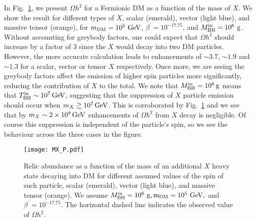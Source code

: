 \documentclass[aps,prd,reprint,twocolumn,preprintnumbers,floatfix,nofootinbib]{revtex4-1}
\newcommand{\MBH}{M_{\rm BH}}
\newcommand{\TBHi}{T_{\rm BH}^{\rm in}}
\newcommand{\MBHi}{M_{\rm BH}^{\rm in}}
\newcommand{\GeV}{\rm GeV}
\newcommand{\g}{\rm g}
\newcommand{\Oh}{\Omega h^2}
\begin{document}
In Fig.~\ref{fig:Xfig}, we present $\Omega h^2$ for a Fermionic DM as a function of the mass of $X$. We show the result for different types of $X$, scalar (emerald), vector (light blue), and massive tensor (orange), for $m_{\rm DM} = 10^5~\GeV$, $\beta^\prime = 10^{-17.75}$, and $\MBH^{\rm in} = 10^6~\g$. Without accounting for greybody factors, one could expect that $\Oh$ should increase by a factor of 3 since the $X$ would decay into two DM particles. However, the more accurate calculation leads to enhancements of $\sim 3.7$, $\sim 1.9$ and $\sim 1.3$ for a scalar, vector or tensor $X$ respectively. Once more, we are seeing the greybody factors affect the emission of higher spin particles more significantly, reducing the contribution of $X$ to the total. We note that $\MBHi=10^6\,\rm{g}$ means that $\TBHi\sim 10^7\,\rm{GeV}$, suggesting that the suppression of $X$ particle emission should occur when $m_{X}\gtrsim 10^7\,\rm{GeV}$. This is corroborated by Fig.~\ref{fig:Xfig} and we see that by $m_{X}\sim 2\times 10^8\,\rm{GeV}$ enhancements of $\Omega h^2$ from $X$ decay is negligible. Of course this suppression is independent of the particle's spin, so we see the behaviour across the three cases in the figure. 
\begin{figure}[t!]
 \texttt{[image: MX\_P.pdf]}
 \caption{Relic abundance as a function of the mass of an additional $X$ heavy state decaying into DM for different assumed values of the spin of such particle, scalar (emerald), vector (light blue), and massive tensor (orange). We assume $\MBH^{\rm in} = 10^6~\g, m_{\rm DM} = 10^5~\GeV, $ and $\beta^\prime = 10^{-17.75}$. The horizontal dashed line indicates the observed value of $\Oh$. \label{fig:Xfig}}
\end{figure}
\end{document}
